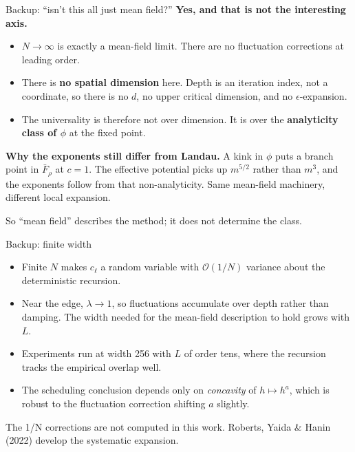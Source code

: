 \documentclass[aspectratio=169,10pt]{beamer}
\newcommand{\scope}[1]{{\footnotesize\color{caveat}#1}}
\begin{document}
\begin{frame}{Backup: ``isn't this all just mean field?''}
  \begingroup
  \small
  {\color{forest}\bfseries Yes, and that is not the interesting axis.}

  \vspace{0.40em}
  \begin{itemize}
    \setlength{\itemsep}{0.35em}
    \item \(N\to\infty\) is exactly a mean-field limit. There are no
      fluctuation corrections at leading order.
    \item There is \textbf{no spatial dimension} here. Depth is an
      iteration index, not a coordinate, so there is no \(d\), no upper
      critical dimension, and no \(\epsilon\)-expansion.
    \item The universality is therefore not over dimension. It is over
      the \textbf{analyticity class of \(\phi\)} at the fixed point.
  \end{itemize}

  \vspace{0.55em}
  {\color{forest}\bfseries Why the exponents still differ from Landau.}
  A kink in \(\phi\) puts a branch point in \(\bar F_\rho\) at \(c=1\).
  The effective potential picks up \(m^{5/2}\) rather than \(m^{3}\), and
  the exponents follow from that non-analyticity. Same mean-field
  machinery, different local expansion.

  \vspace{0.45em}
  \scope{So ``mean field'' describes the method; it does not determine
  the class.}
  \endgroup
\end{frame}

\begin{frame}{Backup: finite width}
  \begingroup
  \small
  \begin{itemize}
    \setlength{\itemsep}{0.40em}
    \item Finite \(N\) makes \(c_\ell\) a random variable with
      \(\mathcal O(1/N)\) variance about the deterministic recursion.
    \item Near the edge, \(\lambda\to1\), so fluctuations accumulate over
      depth rather than damping. The width needed for the mean-field
      description to hold grows with \(L\).
    \item Experiments run at width 256 with \(L\) of order tens, where the
      recursion tracks the empirical overlap well.
    \item The scheduling conclusion depends only on \emph{concavity} of
      \(h\mapsto h^a\), which is robust to the fluctuation correction
      shifting \(a\) slightly.
  \end{itemize}

  \vspace{0.55em}
  \scope{The 1/N corrections are not computed in this work. Roberts,
  Yaida \& Hanin (2022) develop the systematic expansion.}
  \endgroup
\end{frame}
\end{document}
